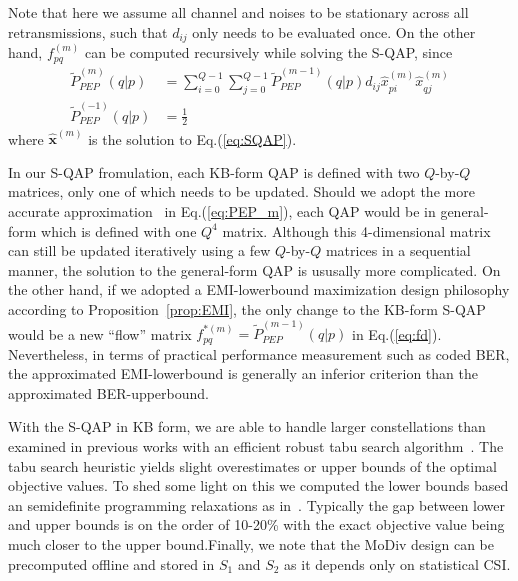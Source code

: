 \documentclass[journal]{IEEEtran}
\begin{document}
Note that here we assume all channel and noises to be stationary across all
retransmissions, such that $d_{ij}$ only needs to be evaluated once. On the
other hand, $f_{pq}^{(m)}$ can be computed recursively while solving the S-QAP,
since
\begin{subequations}
  \begin{align}
    \tilde{P}_{PEP}^{(m)}(q|p) & = \sum_{i=0}^{Q-1}
    \sum_{j=0}^{Q-1}\tilde{P}_{PEP}^{(m-1)}(q|p)d_{ij}\hat{x}_{pi}^{(m)}\hat{x}_{qj}^{(m)}
    \\
    \tilde{P}_{PEP}^{(-1)}(q|p) & = \frac{1}{2}
  \end{align}
\end{subequations}
where $\hat{\mathbf{x}}^{(m)}$ is the solution to Eq.(\ref{eq:SQAP}). 

In our S-QAP fromulation, each KB-form QAP is defined with two $Q$-by-$Q$
matrices, only one of which needs to be updated. Should we adopt the more
accurate approximation~\cite{chiani2003new} in Eq.(\ref{eq:PEP_m}), each QAP
would be in general-form which is defined with one $Q^4$ matrix. Although this
4-dimensional matrix can still be updated iteratively using a few
$Q$-by-$Q$ matrices in a sequential manner, the solution to the general-form QAP
is ususally more complicated. On the other hand, if we adopted a EMI-lowerbound
maximization design philosophy according to Proposition~\ref{prop:EMI}, the only
change to the KB-form S-QAP would be a new ``flow'' matrix $f_{pq}^{*(m)} =
\tilde{P}_{PEP}^{(m-1)}(q|p)$ in Eq.(\ref{eq:fd}). Nevertheless, in terms of
practical performance measurement such as coded BER, the approximated
EMI-lowerbound is generally an inferior criterion than the approximated
BER-upperbound.

With the S-QAP in KB form, we are able
to handle larger constellations than examined in previous works with an
efficient robust tabu search algorithm~\cite{taillard1991robust}. The tabu
search heuristic yields slight overestimates or upper bounds of the optimal
objective values. To shed some light on this we computed the lower bounds based an semidefinite
programming relaxations as in~\cite{wu2011computation}. Typically the gap
between lower and upper bounds is on the order of 10-20\% with the exact
objective value being much closer to the upper bound.Finally, we note that the
MoDiv design can be precomputed offline and stored in $S_1$ and $S_2$ as it depends only on
statistical CSI.
\end{document}
